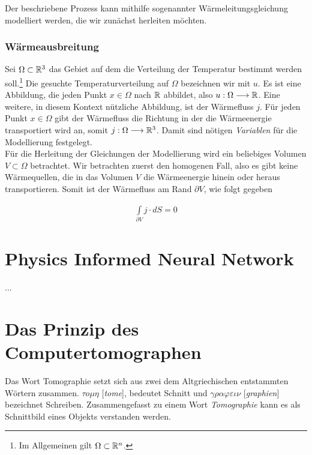 Der beschriebene Prozess kann mithilfe sogenannter Wärmeleitungsgleichung modelliert werden, die wir zunächst herleiten möchten.

\subsubsection*{Wärmeausbreitung}
Sei $\Omega \subset \mathbb{R}^{3}$ das Gebiet auf dem die Verteilung der Temperatur bestimmt werden soll.\footnote{\label{foot:1.1.1} Im Allgemeinen gilt $\Omega \subset \mathbb{R}^n$.} Die gesuchte Temperaturverteilung auf $\Omega$ bezeichnen wir mit $u$. Es ist eine Abbildung, die jeden Punkt $x \in \Omega$ nach $\mathbb{R}$ abbildet, also $u:\Omega \longrightarrow \mathbb{R}$. Eine weitere, in diesem Kontext nützliche Abbildung, ist der Wärmefluss $j$. Für jeden Punkt $x \in \Omega$ gibt der Wärmefluss die Richtung in der die Wärmeenergie transportiert wird an, somit $j:\Omega \longrightarrow \mathbb{R}^3$. Damit sind nötigen \textit{Variablen} für die Modellierung festgelegt.\\

Für die Herleitung der Gleichungen der Modellierung wird ein beliebiges Volumen $V \subset \Omega$ betrachtet. Wir betrachten zuerst den homogenen Fall, also es gibt keine Wärmequellen, die in das Volumen $V$ die Wärmeenergie hinein oder heraus transportieren. Somit ist der Wärmefluss am Rand $\partial V$, wie folgt gegeben

\begin{eqnarray}
	\int\limits_{\partial V} j \cdot dS = 0
\end{eqnarray}



\section{Physics Informed Neural Network}

...

\section{Das Prinzip des Computertomographen}
\label{cha:1.1}

Das Wort Tomographie setzt sich aus zwei dem Altgriechischen entstammten Wörtern zusammen. $\tau o\mu\eta$ [\textit{tome}], bedeutet Schnitt und $\gamma\rho\alpha\varphi\varepsilon\iota\nu$ [\textit{graphien}] bezeichnet Schreiben. Zusammengefasst zu einem Wort \textit{Tomographie} kann es als Schnittbild eines Objekts verstanden werden. 

